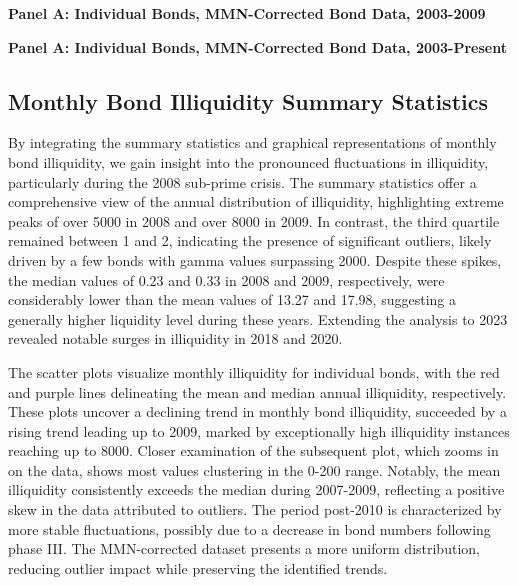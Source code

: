 \documentclass{article}
\newcommand*{\PathToOutput}{../output/}%
\begin{document}
\begin{table}[hbt!]
\centering
\textbf{\small Panel A: Individual Bonds, MMN-Corrected Bond Data, 2003-2009}
\small %
\renewcommand{\arraystretch}{0.92} %

\label{table:table2_daily_mmn_paper}
\end{table}
\FloatBarrier %

\begin{table}[hbt!]
\centering
\textbf{\small Panel A: Individual Bonds, MMN-Corrected Bond Data, 2003-Present}
\resizebox{\textwidth}{!}{%
    
}
\label{table:table2_daily_mmn_new}
\end{table}
\FloatBarrier %

\subsection{Monthly Bond Illiquidity Summary Statistics}

By integrating the summary statistics and graphical representations of monthly bond illiquidity, we gain insight into the pronounced fluctuations in illiquidity, particularly during the 2008 sub-prime crisis. The summary statistics offer a comprehensive view of the annual distribution of illiquidity, highlighting extreme peaks of over 5000 in 2008 and over 8000 in 2009. In contrast, the third quartile remained between 1 and 2, indicating the presence of significant outliers, likely driven by a few bonds with gamma values surpassing 2000. Despite these spikes, the median values of 0.23 and 0.33 in 2008 and 2009, respectively, were considerably lower than the mean values of 13.27 and 17.98, suggesting a generally higher liquidity level during these years. Extending the analysis to 2023 revealed notable surges in illiquidity in 2018 and 2020.

The scatter plots visualize monthly illiquidity for individual bonds, with the red and purple lines delineating the mean and median annual illiquidity, respectively. These plots uncover a declining trend in monthly bond illiquidity, succeeded by a rising trend leading up to 2009, marked by exceptionally high illiquidity instances reaching up to 8000. Closer examination of the subsequent plot, which zooms in on the data, shows most values clustering in the 0-200 range. Notably, the mean illiquidity consistently exceeds the median during 2007-2009, reflecting a positive skew in the data attributed to outliers. The period post-2010 is characterized by more stable fluctuations, possibly due to a decrease in bond numbers following phase III. The MMN-corrected dataset presents a more uniform distribution, reducing outlier impact while preserving the identified trends.
\end{document}
